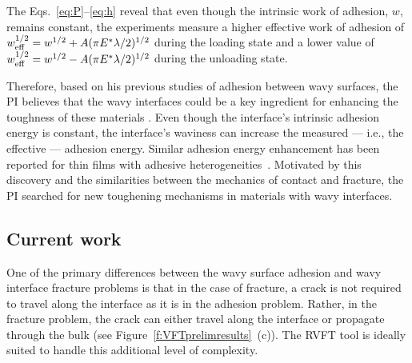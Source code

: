 \documentclass[10pt,letterpaper]{article}
\begin{document}
    The Eqs.~\eqref{eq:P}--\eqref{eq:h} reveal that even though the intrinsic work of adhesion, $w$, remains constant, the experiments measure a higher effective work of adhesion of $w_{\rm eff}^{1/2} = w^{1/2} + A(\pi E^* \lambda/2)^{1/2}$ during the loading state and a lower value of $w_{\rm eff}^{1/2} = w^{1/2} - A(\pi E^* \lambda/2)^{1/2}$ during the unloading state.

    Therefore, based on his previous studies of adhesion between wavy surfaces, the PI believes that the wavy interfaces could be a key ingredient for enhancing the toughness of these materials \cite{li2012numerical,wang2012specific,zavattieri2007determination,haghpanah2014adhesively}.
    Even though the interface's intrinsic adhesion energy is constant, the interface's waviness can increase the measured --- i.e., the effective --- adhesion energy.
    Similar adhesion energy enhancement has been reported for thin films with adhesive heterogeneities~\cite{xia2015adhesion}.
    Motivated by this discovery and the similarities between the mechanics of contact and fracture, the PI searched for new toughening mechanisms in materials with wavy interfaces.

  \subsection{Current work}
    \label{s:curr}
    One of the primary differences between the wavy surface adhesion and wavy interface fracture problems is that in the case of fracture, a crack is not required to travel along the interface as it is in the adhesion problem.
   Rather, in the fracture problem, the crack can either travel along the interface or propagate through the bulk (see Figure~\ref{f:VFTprelimresults}~(c)). The RVFT tool is ideally suited to handle this additional level of complexity.
\end{document}
